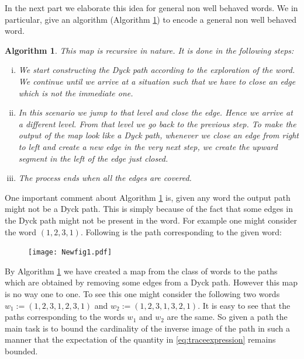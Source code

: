 \documentclass[12pt]{article}
\numberwithin{equation}{section}
\newtheorem{algorithm}{Algorithm}[section]
\numberwithin{equation}{section}
\theoremstyle{definition}
\renewcommand{\1}{\bf 1}
\begin{document}
\noindent  
 In the next part we elaborate this idea for general non well behaved words. We in particular, give an algorithm (Algorithm \ref{alg:encode}) to encode a general non well behaved word. 
 \begin{algorithm}\label{alg:encode}
 This map is recursive in nature. It is done in the following steps:
\begin{enumerate}[(i)]
\item We start constructing the Dyck path according to the exploration of the word. We continue until we arrive at a situation such that we have to close an edge which is not the immediate one.
\item In this scenario we jump to that level and close the edge. Hence we arrive at a different level. From that level we go back to the previous step. To make the output of the map look like a Dyck path, whenever we close an edge from right to left and create a new edge in the very next step, we create the upward segment in the left of the edge just closed. 
\item The process ends when all the edges are covered. 
\end{enumerate}
 \end{algorithm}

\noindent 
One important comment about Algorithm \ref{alg:encode} is, given any word the output path might not be a Dyck path. This is simply because of the fact that some edges in the Dyck path might not be present in the word. For example one might consider the word $(1,2,3,1)$. Following is the path corresponding to the given word:
\begin{figure}[H]
        \begin{center}
                \texttt{[image: Newfig1.pdf]}
        ~ %
      \end{center}   
 \end{figure} 
By Algorithm \ref{alg:encode} we have created a map from the class of words to the paths which are obtained by removing some edges from a Dyck path. However this map is no way one to one. To see this one might consider the following two words $w_{1}:=(1,2,3,1,2,3,1)$ and $w_{2}:=(1,2,3,1,3,2,1)$. It is easy to see that the paths corresponding to the words $w_{1}$ and $w_{2}$ are the same. So given a path the main task is to bound the cardinality of the inverse image of the path in such a manner that the expectation of the quantity in \eqref{eq:traceexpression} remains bounded.
  
\end{document}

